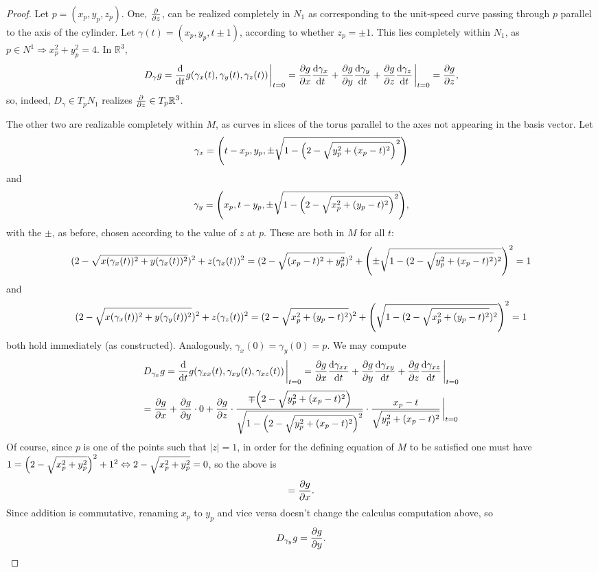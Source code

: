 \documentclass{article}
\begin{document}
\begin{proof}
  Let $p = (x_{p}, y_{p}, z_{p})$.
  One, $\pdv{z}$, can be realized completely in $N_{1}$
  as corresponding to the unit-speed curve passing through $p$ parallel to the axis of the cylinder.
  Let $\gamma(t) = (x_{p}, y_{p}, t \pm 1)$, according to whether $z_{p} = \pm 1$.
  This lies completely within $N_{1}$, as $p \in N^{1} \Rightarrow x_{p}^{2} + y_{p}^{2} = 4$.
  In $\mathbb{R}^{3}$,
  \[
    D_{\gamma}g = \dv{t}g(\gamma_{x}(t), \gamma_{y}(t), \gamma_{z}(t))\eval_{t = 0}
    = \pdv{g}{x}\dv{\gamma_{x}}{t} + \pdv{g}{y}\dv{\gamma_{y}}{t} + \pdv{g}{z}\dv{\gamma_{z}}{t}\eval_{t = 0}
    = \pdv{g}{z},
  \]
  so, indeed, $D_{\gamma} \in T_{p}N_{1}$ realizes $\pdv{z} \in T_{p}\mathbb{R}^{3}$.

  The other two are realizable completely within $M$, as curves in slices of the torus
  parallel to the axes not appearing in the basis vector.
  Let
  \[
    \gamma_{x} = \qty(t - x_{p}, y_{p}, \pm\sqrt{1 - \qty(2 - \sqrt{y_{p}^{2} + (x_{p} - t)^{2}})^{2}})
  \]
  and
  \[
    \gamma_{y} = \qty(x_{p}, t - y_{p}, \pm\sqrt{1 - \qty(2 - \sqrt{x_{p}^{2} + (y_{p} - t)^{2}})^{2}}),
  \]
  with the $\pm$, as before, chosen according to the value of $z$ at $p$.
  These are both in $M$ for all $t$:
  \[
    (2 - \sqrt{x(\gamma_{x}(t))^{2} + y(\gamma_{x}(t))^{2}})^{2} + z(\gamma_{x}(t))^{2}
    = (2 - \sqrt{(x_{p} - t)^{2} + y_{p}^{2}})^{2} + \qty(\pm \sqrt{1 - (2 - \sqrt{y_{p}^{2} + (x_{p} - t)^{2}})^{2}})^{2} = 1
  \]
  and
  \[
    (2 - \sqrt{x(\gamma_{x}(t))^{2} + y(\gamma_{y}(t))^{2}})^{2} + z(\gamma_{z}(t))^{2}
    = (2 - \sqrt{x_{p}^{2} + (y_{p} - t)^{2}})^{2} + \qty(\sqrt{1 - (2 - \sqrt{x_{p}^{2} + (y_{p} - t)^{2}})^{2}})^{2} = 1
  \]
  both hold immediately (as constructed).
  Analogously, $\gamma_{x}(0) = \gamma_{y}(0) = p$.
  We may compute
  \[
    D_{\gamma_{x}}g = \dv{t}g(\gamma_{xx}(t), \gamma_{xy}(t), \gamma_{xz}(t))\eval_{t = 0}
    = \pdv{g}{x}\dv{\gamma_{xx}}{t} + \pdv{g}{y}\dv{\gamma_{xy}}{t} + \pdv{g}{z}\dv{\gamma_{xz}}{t}\eval_{t = 0}
  \]
  \[
    = \pdv{g}{x} + \pdv{g}{y} \cdot 0 + \pdv{g}{z} \cdot \frac{\mp \qty(2 - \sqrt{y_{p}^{2} + (x_{p} - t)^{2}})}
    {\sqrt{1 - \qty(2 - \sqrt{y_{p}^{2} + (x_{p} - t)^{2}})^{2}}} \cdot \frac{x_{p} - t}{\sqrt{y_{p}^{2} + (x_{p} - t)^{2}}}
    \eval_{t = 0}
  \]
  Of course, since $p$ is one of the points such that $|z| = 1$, in order for the defining equation of $M$ to be satisfied
  one must have $1 = \qty(2 - \sqrt{x_{p}^{2} + y_{p}^{2}})^{2} + 1^{2} \Leftrightarrow 2 - \sqrt{x_{p}^{2} + y_{p}^{2}} = 0$,
  so the above is
  \[
    = \pdv{g}{x}.
  \]
  Since addition is commutative, renaming $x_{p}$ to $y_{p}$ and vice versa doesn't change the calculus computation above, so
  \[
    D_{\gamma_{y}}g = \pdv{g}{y}.
  \]


\end{proof}
\end{document}
